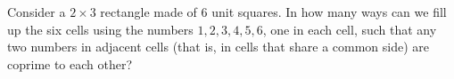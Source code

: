Consider a $2 \times 3$ rectangle made of $6$ unit squares. In how many ways can we fill up the six cells using the numbers $1, 2, 3, 4, 5, 6$, one in each cell, such that any two numbers in adjacent cells (that is, in cells that share a common side) are coprime to each other?
